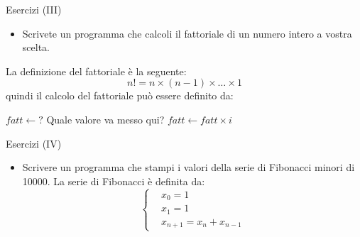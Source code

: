 \begin{frame}{Esercizi (III)}
  \begin{itemize}
   \item Scrivete un programma che calcoli il fattoriale di un numero intero a vostra scelta.
  \end{itemize}

  La definizione del fattoriale è la seguente:
  \begin{equation}
    n! = n \times (n - 1) \times \dots \times 1
  \end{equation}
  quindi il calcolo del fattoriale può essere definito da: 
  \begin{center}
    \begin{minipage}{8cm}
      \begin{algorithmic}[1]
	\State $fatt \gets ?$ \Comment Quale valore va messo qui?
	  \State $fatt \gets fatt \times i$ 
	\EndFor
      \end{algorithmic}
   \end{minipage}
  \end{center}

\end{frame}

\begin{frame}{Esercizi (IV)}
  \begin{itemize}
    \item Scrivere un programma che stampi i valori della serie di Fibonacci minori di 10000.
    La serie di Fibonacci \`e definita da:
    \begin{equation*}
      \left\{\begin{aligned}
	  & x_0 = 1\\
	  & x_1 = 1\\
	  & x_{n+1} = x_{n} + x_{n-1}
      \end{aligned}\right.
    \end{equation*}
  \end{itemize}

\end{frame}


